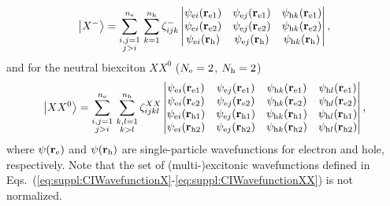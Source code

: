 \begin{equation}
\label{eq:suppl:CIWavefunctionX-}
\left|X^-\right>=
\sum^{n_{\rm{e}}}_{\substack{i,j=1\\j>i}}\,\sum^{n_{\rm{h}}}_{k=1}\zeta^-_{ijk}
\begin{vmatrix}
\psi_{{\rm{e}}i}(\mathbf{r}_{{\rm{e}}1})&\psi_{{\rm{e}}j}(\mathbf{r}_{{\rm{e}}1})&\psi_{{\rm{h}}k}(\mathbf{r}_{{\rm{e}}1})\\
\psi_{{\rm{e}}i}(\mathbf{r}_{{\rm{e}}2})&\psi_{{\rm{e}}j}(\mathbf{r}_{{\rm{e}}2})&\psi_{{\rm{h}}k}(\mathbf{r}_{{\rm{e}}2})\\
\psi_{{\rm{e}}i}(\mathbf{r}_{{\rm{h}}})&\psi_{{\rm{e}}j}(\mathbf{r}_{{\rm{h}}})&\psi_{{\rm{h}}k}(\mathbf{r}_{{\rm{h}}})\\
\end{vmatrix},
\end{equation}
%
and for the neutral biexciton $XX^0$ ($N_{\rm{e}}=2$, $N_{\rm{h}}=2$)
%
\begin{equation}
\label{eq:suppl:CIWavefunctionXX}
\left|XX^0\right>=
\sum^{n_{\rm{e}}}_{\substack{i,j=1\\j>i}}\,\sum^{n_{\rm{h}}}_{\substack{k,l=1\\k>l}}\zeta^{XX}_{ijkl}
\begin{vmatrix}
\psi_{{\rm{e}}i}(\mathbf{r}_{{\rm{e}}1})&\psi_{{\rm{e}}j}(\mathbf{r}_{{\rm{e}}1})&\psi_{{\rm{h}}k}(\mathbf{r}_{{\rm{e}}1})&\psi_{{\rm{h}}l}(\mathbf{r}_{{\rm{e}}1})\\
\psi_{{\rm{e}}i}(\mathbf{r}_{{\rm{e}}2})&\psi_{{\rm{e}}j}(\mathbf{r}_{{\rm{e}}2})&\psi_{{\rm{h}}k}(\mathbf{r}_{{\rm{e}}2})&\psi_{{\rm{h}}l}(\mathbf{r}_{{\rm{e}}2})\\
\psi_{{\rm{e}}i}(\mathbf{r}_{{\rm{h}}1})&\psi_{{\rm{e}}j}(\mathbf{r}_{{\rm{h}}1})&\psi_{{\rm{h}}k}(\mathbf{r}_{{\rm{h}}1})&\psi_{{\rm{h}}l}(\mathbf{r}_{{\rm{h}}1})\\
\psi_{{\rm{e}}i}(\mathbf{r}_{{\rm{h}}2})&\psi_{{\rm{e}}j}(\mathbf{r}_{{\rm{h}}2})&\psi_{{\rm{h}}k}(\mathbf{r}_{{\rm{h}}2})&\psi_{{\rm{h}}l}(\mathbf{r}_{{\rm{h}}2})\\
\end{vmatrix},
\end{equation}
%
where $\psi(\mathbf{r}_{{\rm{e}}})$ and $\psi(\mathbf{r}_{{\rm{h}}})$ are single-particle wavefunctions for electron and hole, respectively. Note that the set of (multi-)excitonic wavefunctions defined in Eqs.~(\ref{eq:suppl:CIWavefunctionX}-\ref{eq:suppl:CIWavefunctionXX}) is not normalized.

